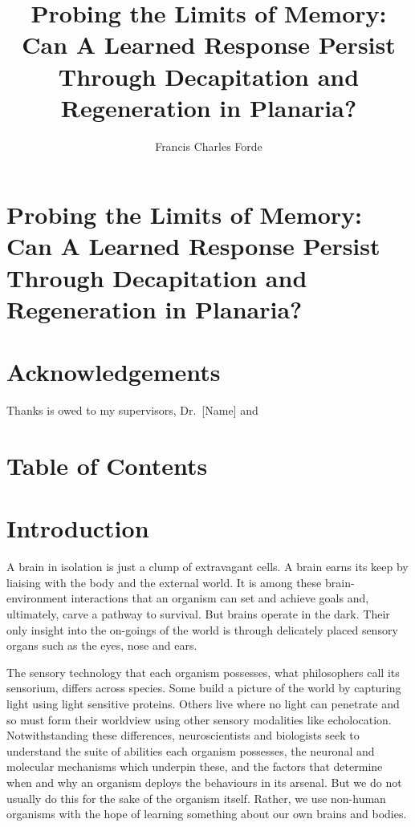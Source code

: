 \documentclass[
  jou,
  floatsintext,
  longtable,
  nolmodern,
  notxfonts,
  notimes,
  donotrepeattitle,
  colorlinks=true,linkcolor=blue,citecolor=blue,urlcolor=blue]{apa7}
\title{Probing the Limits of Memory: Can A Learned Response Persist
Through Decapitation and Regeneration in Planaria?}
\author{Francis Charles Forde}
\affiliation{
{School of Psychology, Victoria University of Wellington}}
\begin{document}
\maketitle

\hypertarget{toc}{}
\tableofcontents
\newpage
\section[Introduction]{Probing the Limits of Memory: Can A Learned
Response Persist Through Decapitation and Regeneration in Planaria?}

\setcounter{secnumdepth}{5}

\setlength\LTleft{0pt}


\section*{Acknowledgements}\label{acknowledgements}

Thanks is owed to my supervisors, Dr.~{[}Name{]} and

\newpage

\label{toc}
\section*{Table of Contents}\label{table-of-contents}

\newpage

\section{Introduction}\label{sec-introduction}

A brain in isolation is just a clump of extravagant cells. A brain earns
its keep by liaising with the body and the external world. It is among
these brain-environment interactions that an organism can set and
achieve goals and, ultimately, carve a pathway to survival. But brains
operate in the dark. Their only insight into the on-goings of the world
is through delicately placed sensory organs such as the eyes, nose and
ears.

The sensory technology that each organism possesses, what philosophers
call its sensorium, differs across species. Some build a picture of the
world by capturing light using light sensitive proteins. Others live
where no light can penetrate and so must form their worldview using
other sensory modalities like echolocation. Notwithstanding these
differences, neuroscientists and biologists seek to understand the suite
of abilities each organism possesses, the neuronal and molecular
mechanisms which underpin these, and the factors that determine when and
why an organism deploys the behaviours in its arsenal. But we do not
usually do this for the sake of the organism itself. Rather, we use
non-human organisms with the hope of learning something about our own
brains and bodies.
\end{document}
